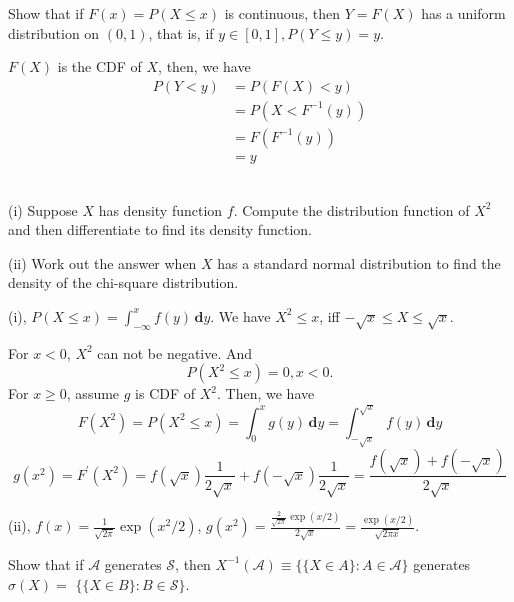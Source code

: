 \documentclass[en, normal, 11pt, black]{elegantnote}
\newenvironment{exercise}[1]{\begin{tcolorbox}[colback=black!15, colframe=black!80, breakable, title=#1]}{\end{tcolorbox}}
\renewenvironment{proof}{\begin{tcolorbox}[colback=white, colframe=black!50, breakable, title=Proof. ]\setlength{\parskip}{0.8em}}{\\\rightline{$\square$}\end{tcolorbox}}
\newenvironment{solution}{\begin{tcolorbox}[colback=white, colframe=black!50, breakable, title=Solution. ]\setlength{\parskip}{0.8em}}{\end{tcolorbox}}
\newcommand{\der}{\,\mathbf{d}}
\begin{document}
    \begin{exercise}{1.2.4}
        Show that if $F(x)=P(X \leq x)$ is continuous, then $Y=F(X)$ has a uniform distribution on $(0,1)$, that is, if $y \in[0,1], P(Y \leq y)=y$.
    \end{exercise}

    \begin{proof}
        $F(X)$ is the CDF of $X$, then, we have
        \begin{align*}
            P(Y<y)&=P(F(X)<y)\\
            &=P(X<F^{-1}(y))\\
            &=F(F^{-1}(y))\\
            &=y
        \end{align*}
    \end{proof}

    \begin{exercise}{1.2.7}
        (i) Suppose $X$ has density function $f$. Compute the distribution function of $X^{2}$ and then differentiate to find its density function. 
        
        (ii) Work out the answer when $X$ has a standard normal distribution to find the density of the chi-square distribution. 
    \end{exercise}

    \begin{solution}
        (i), $P(X\leqslant x)=\int_{-\infty}^xf(y)\der y$. We have $X^2\leqslant x$, iff $-\sqrt{x}\leqslant X \leqslant \sqrt{x}$. 
        
        For $x<0$, $X^2$ can not be negative. And
        \[P(X^2\leqslant x)=0, x<0.\]
        For $x\geqslant 0$, assume $g$ is CDF of $X^2$. Then, we have
        \[F(X^2)=P(X^2\leqslant x)=\int_0^x g(y)\der y=\int_{-\sqrt{x}}^{\sqrt{x}}f(y)\der y\]
        \[g(x^2)=F^\prime(X^2)=f(\sqrt{x})\frac{1}{2\sqrt{x}}+f(-\sqrt{x})\frac{1}{2\sqrt{x}}=\frac{f(\sqrt{x})+f(-\sqrt{x})}{2\sqrt{x}}\]

        (ii), $f(x)=\frac{1}{\sqrt{2\pi}}\exp(x^2/2)$, $g(x^2)=\frac{\frac{2}{\sqrt{2\pi}}\exp(x/2)}{2\sqrt{x}}=\frac{\exp(x/2)}{\sqrt{2\pi x}}$. 
    \end{solution}

    \begin{exercise}{1.3.1}
        Show that if $\mathcal{A}$ generates $\mathcal{S}$, then $X^{-1}(\mathcal{A}) \equiv\{\{X \in A\}: A \in \mathcal{A}\}$ generates $\sigma(X)=$ $\{\{X \in B\}: B \in \mathcal{S}\}$. 
    \end{exercise}
\end{document}
